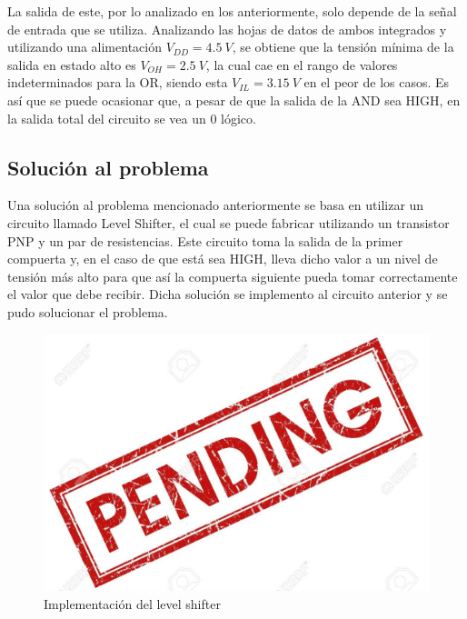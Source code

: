 La salida de este, por lo analizado en los anteriormente, solo depende de la señal de entrada que se utiliza. Analizando las hojas de datos de ambos integrados y utilizando una alimentación $V_{DD}= 4.5 \ V$, se obtiene que la tensión mínima de la salida en estado alto es $V_{OH}=2.5 \ V$, la cual cae en el rango de valores indeterminados para la OR, siendo esta $V_{IL}= 3.15 \ V$ en el peor de los casos. Es así que se puede ocasionar que, a pesar de que la salida de la AND sea HIGH, en la salida total del circuito se vea un 0 lógico.

\subsection{Solución al problema}

Una solución al problema mencionado anteriormente se basa en utilizar un circuito llamado Level Shifter, el cual se puede fabricar utilizando un transistor PNP y un par de resistencias. Este circuito toma la salida de la primer compuerta y, en el caso de que está sea HIGH, lleva dicho valor a un nivel de tensión más alto para que así la compuerta siguiente pueda tomar correctamente el valor que debe recibir. Dicha solución se implemento al circuito anterior y se pudo solucionar el problema.

\begin{figure}[h]
    \centering
    \includegraphics{ImagenesEjercicio5/pend.jpg}
    \caption{Implementación del level shifter}
\end{figure}

